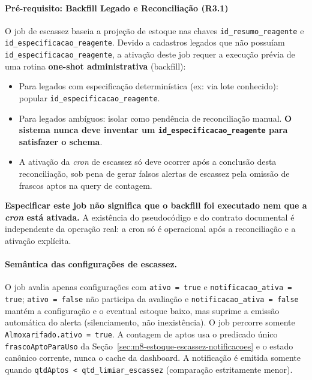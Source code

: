 \paragraph{Pré-requisito: Backfill Legado e Reconciliação (R3.1)}
O job de escassez baseia a projeção de estoque nas chaves \texttt{id\_resumo\_reagente} e \texttt{id\_especificacao\_reagente}. Devido a cadastros legados que não possuíam \texttt{id\_especificacao\_reagente}, a ativação deste job requer a execução prévia de uma rotina \textbf{one-shot administrativa} (backfill):
\begin{itemize}
    \item Para legados com especificação determinística (ex: via lote conhecido): popular \texttt{id\_especificacao\_reagente}.
    \item Para legados ambíguos: isolar como pendência de reconciliação manual. \textbf{O sistema nunca deve inventar um \texttt{id\_especificacao\_reagente} para satisfazer o schema}.
    \item A ativação da \textit{cron} de escassez só deve ocorrer após a conclusão desta reconciliação, sob pena de gerar falsos alertas de escassez pela omissão de frascos aptos na query de contagem.
\end{itemize}
\textbf{Especificar este job não significa que o backfill foi executado nem que a \textit{cron} está ativada.} A existência do pseudocódigo e do contrato documental é independente da operação real: a cron só é operacional após a reconciliação e a ativação explícita.

\paragraph{Semântica das configurações de escassez.}
O job avalia apenas configurações com \texttt{ativo = true} e \texttt{notificacao\_ativa = true}; \texttt{ativo = false} não participa da avaliação e \texttt{notificacao\_ativa = false} mantém a configuração e o eventual estoque baixo, mas suprime a emissão automática do alerta (silenciamento, não inexistência). O job percorre somente \texttt{Almoxarifado.ativo = true}. A contagem de aptos usa o predicado único \texttt{frascoAptoParaUso} da Seção~\ref{sec:m8-estoque-escassez-notificacoes} e o estado canônico corrente, nunca o cache da dashboard. A notificação é emitida somente quando \texttt{qtdAptos < qtd\_limiar\_escassez} (comparação estritamente menor).


